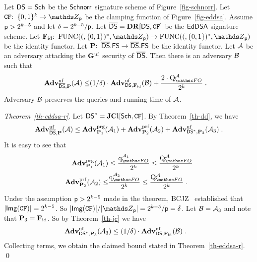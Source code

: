 \begin{theorem}\label{th-eddsa-r} Let $\mathsf{DS}=\mathsf{Sch}$ be the $\mathsf{Schnorr}$ signature scheme of Figure~\ref{fig-schnorr}. Let $\CFEDSA\Colon\allowbreak\bits^k\allowbreak\to\allowbreak\Z_{\Prime}$ be the clamping function of Figure~\ref{fig-eddsa}. Assume %
$\mathsf{p} > 2^{k-5}$ and let $\delta = 2^{k-5}/\mathsf{p}$. Let $\overline{\mathsf{DS}} = \mathbf{DR}[\mathsf{DS},\mathtt{CF}]$ be the $\mathsf{EdDSA}$ signature scheme. 
Let $\idFunctor\Colon\AllFuncs(\bits^*,\Z_{\Prime})\to \AllFuncs(\bits^*,\Z_{\Prime})$ be the identity functor.  Let $\mathbf{P}{:\;\;}\overline{\mathsf{DS}}.\mathsf{FS}\to \overline{\mathsf{DS}}.\mathsf{FS}$ be the identity functor. Let $\mathcal{A}$ be an adversary attacking the $\mathbf{G}^{\mathrm{uf}}$ security of $\overline{\mathsf{DS}}$. 
Then there is an adversary $\mathcal{B}$ such that
\begin{align*}
	\ufAdv{\fDS,\idFunctortwo}{\advA} \leq & 
	 (1/\delta)\cdot\ufAdv{\DS,\idFunctor}{\advB} 
	 + \frac{2\cdot \Queries{\HASH}{\advA}}{2^k} 	 \;.
\end{align*}
Adversary $\mathcal{B}$ preserves the queries and running time of $\mathcal{A}$. 
\end{theorem}
\begin{proof}[Theorem~\ref{th-eddsa-r}] Let $\mathsf{DS}^* = \mathbf{JCl}[\mathsf{Sch},\mathtt{CF}]$. 
By Theorem~\ref{th-dd}, we have 
	$$\mathbf{Adv}^{\mathrm{uf}}_{\overline{\mathsf{DS}},\mathbf{P}}(\mathcal{A}) \leq   \mathbf{Adv}^{\mathrm{prg}}_{\mathbf{P}_1}(\mathcal{A}_1) + \mathbf{Adv}^{\mathrm{prf}}_{\mathbf{P}_2}(\mathcal{A}_2) + \mathbf{Adv}^{\mathrm{uf}}_{\mathsf{DS}^*,\mathbf{P}_3}(\mathcal{A}_3) \;.$$
It is easy to see that
\begin{align*}
	\prgAdv{\idFunctortwo_1}{\advA_1} &\leq \frac{\QueriesD{\HASH}{\advA_1}}{2^k} \leq \frac{\Queries{\HASH}{\advA}}{2^k} \\
	\prfAdv{\idFunctortwo_2}{\advA_2}  \leq& \frac{\QueriesD{\HASH}{\advA_2}}{2^k}\leq \frac{\Queries{\HASH}{\advA}}{2^k} \;.
\end{align*}  
Under the assumption $\mathsf{p} > 2^{k-5}$ made in the theorem, 
	BCJZ~\cite{SP:BCJZ21} established that $|\mathsf{Img}(\mathtt{CF})|=2^{k-5}$. So $|\Img(\CFEDSA)|/|\Z_{\Prime}| = 2^{k-5}/\Prime = \delta$. Let $\mathcal{B} = \mathcal{A}_3$ and note that $\mathbf{P}_3 = \mathbf{F}_{\mathrm{id}}$. So by Theorem~\ref{th-jc} we have 
\begin{align}
	\mathbf{Adv}^{\mathrm{uf}}_{\mathsf{DS}^*,\mathbf{P}_3}(\mathcal{A}_3) &\leq (1/\delta)\cdot\mathbf{Adv}^{\mathrm{uf}}_{\mathsf{DS},\mathbf{F}_{\mathrm{id}}}(\mathcal{B}) \;.
\end{align}
Collecting terms, we obtain the claimed bound stated in Theorem~\ref{th-eddsa-r}. \qed
\end{proof}


